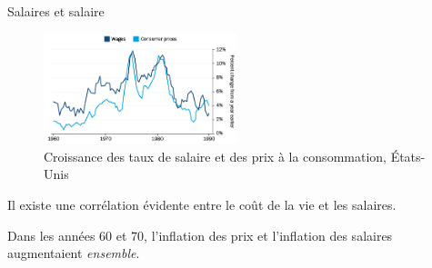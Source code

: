 \documentclass[
  ignorenonframetext,
  aspectratio=169,
]{beamer}
\begin{document}
\begin{frame}{Salaires et salaire}
\label{salaires-et-salaire}
\begin{figure}[H]

{\centering \includegraphics[width=0.5\textwidth,height=\textheight]{assets/wage_price_spiral.png}

}

\caption{Croissance des taux de salaire et des prix à la consommation,
États-Unis}

\end{figure}%

Il existe une corrélation évidente entre le coût de la vie et les
salaires.

Dans les années 60 et 70, l'inflation des prix et l'inflation des
salaires augmentaient \emph{ensemble}.
\end{frame}
\end{document}
